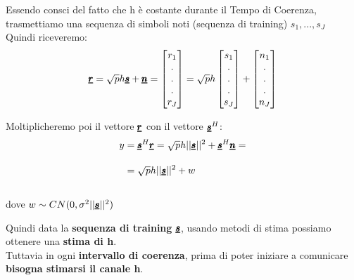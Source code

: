 Essendo consci del fatto che h è costante durante il Tempo di Coerenza, trasmettiamo una sequenza di simboli noti (sequenza di training) $s_1,...,s_J$\\

Quindi riceveremo:
\begin{equation*}
    \pmb{\underline{r}} = \sqrt{p} h \pmb{\underline{s}} + \pmb{\underline{n}}= \begin{bmatrix}
    r_1\\.\\.\\.\\r_J
    \end{bmatrix}
 = \sqrt{p}h
     \begin{bmatrix}
    s_1\\.\\.\\.\\s_J
    \end{bmatrix} +
    \begin{bmatrix}
    n_1\\.\\.\\.\\n_J
    \end{bmatrix}
\end{equation*}

Moltiplicheremo poi il vettore $\pmb{\underline{r}}$ con il vettore $\pmb{\underline{s}}^H$:
\begin{equation*}
\begin{aligned}
    y &= \pmb{\underline{s}}^H \pmb{\underline{r}} = \sqrt{p} h ||\pmb{\underline{s}}||^2 + \pmb{\underline{s}}^H\pmb{\underline{n}} = \\[10pt]
    &=\sqrt{p}h||\pmb{\underline{s}}||^2 + w
\end{aligned}
\end{equation*}
\\
dove $w \sim  CN(0,\sigma^2 ||\pmb{\underline{s}}||^2) $

Quindi data la \textbf{sequenza di training} $\pmb{\underline{s}}$, usando metodi di stima possiamo ottenere una \textbf{stima di h}.\\

Tuttavia in ogni \textbf{intervallo di coerenza}, prima di poter iniziare a comunicare \textbf{bisogna stimarsi il canale h}.





